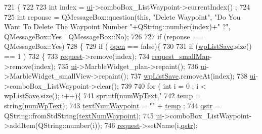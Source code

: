 \begin{DoxyCode}
721 \{
722 
723     \textcolor{keywordtype}{int} index = \hyperlink{a00008_a6dc041ef6a2ffb329928d2913e8344e6}{ui}->comboBox\_ListWaypoint->currentIndex() ;
724 
725     \textcolor{keywordtype}{int} reponse =  QMessageBox::question(\textcolor{keyword}{this}, \textcolor{stringliteral}{"Delete Waypoint"}, \textcolor{stringliteral}{"Do You Want To Delete The Waypoint
       Number "}+QString::number(index)+\textcolor{stringliteral}{" ?"}, QMessageBox::Yes | QMessageBox::No);
726 
727         \textcolor{keywordflow}{if} (reponse == QMessageBox::Yes)
728         \{
729             \textcolor{keywordflow}{if} ( \hyperlink{a00008_a8c7e45250b1eb6821dd59fb2a9a016d7}{open} == \textcolor{keyword}{false})\{
730 
731                  \textcolor{keywordflow}{if} (\hyperlink{a00008_ad11e2550a13b49086c06cf1c1dbf0a45}{wpListSave}.size() == 1 )
732                  \{
733                      \hyperlink{a00008_ade0ea03ae98566eaed4f7a1f331f237a}{request}->remove(index);
734                      \hyperlink{a00008_aeae2fdde26f8ed9003c0cf66a1f25662}{request\_smallMap}->remove(index);
735                      \hyperlink{a00008_a6dc041ef6a2ffb329928d2913e8344e6}{ui}->MarbleWidget\_plan->repaint();
736                      \hyperlink{a00008_a6dc041ef6a2ffb329928d2913e8344e6}{ui}->MarbleWidget\_smallView->repaint();
737                      \hyperlink{a00008_ad11e2550a13b49086c06cf1c1dbf0a45}{wpListSave}.removeAt(index);
738                      \hyperlink{a00008_a6dc041ef6a2ffb329928d2913e8344e6}{ui}->comboBox\_ListWaypoint->clear();
739 
740                      \textcolor{keywordflow}{for} ( \textcolor{keywordtype}{int} i = 0 ; i < \hyperlink{a00008_ad11e2550a13b49086c06cf1c1dbf0a45}{wpListSave}.size(); i++)\{
741                          sprintf(\hyperlink{a00008_aad93f0b04d6ea6ac097124ef453bef9d}{numWpText},\textcolor{stringliteral}{"%
742                          \hyperlink{a00008_a57c52213e1c32a667a5963a122e0a23b}{temp} = string(\hyperlink{a00008_aad93f0b04d6ea6ac097124ef453bef9d}{numWpText});
743                          \hyperlink{a00008_aa6011e6576184fcd9e0841fdffbaa826}{textNumWaypoint} = \textcolor{stringliteral}{""} + \hyperlink{a00008_a57c52213e1c32a667a5963a122e0a23b}{temp} ;
744                          \hyperlink{a00008_add3cc0473ea4a2ff453620e16ac24056}{qstr} = QString::fromStdString(\hyperlink{a00008_aa6011e6576184fcd9e0841fdffbaa826}{textNumWaypoint});
745                          \hyperlink{a00008_a6dc041ef6a2ffb329928d2913e8344e6}{ui}->comboBox\_ListWaypoint->addItem(QString::number(i));
746                          \hyperlink{a00008_ade0ea03ae98566eaed4f7a1f331f237a}{request}->setName(i,\hyperlink{a00008_add3cc0473ea4a2ff453620e16ac24056}{qstr});
}
\end{DoxyCode}
